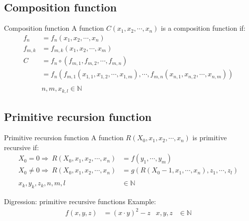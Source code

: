 \documentclass[]{beamer}
\begin{document}
\subsection{Composition function}

\begin{frame}{Composition function}
A function $C(x_1,x_2,\cdots,x_n)$ is a composition function if: \\
\begin{align*}
f_n &= f_n(x_1,x_2,\cdots,x_n) \\
f_{m,k} &= f_{m,k}(x_1,x_2,\cdots,x_m) \\
C &= f_n \circ (f_{m,1},f_{m,2},\cdots,f_{m,n})\\
&= f_n(f_{m,1}(x_{1,1},x_{1,2},\cdots,x_{1,m}),\cdots,f_{m,n}(x_{n,1},x_{n,2},\cdots,x_{n,m}))\\
\\
&n,m,x_{k,l } \in \mathbb{N}
\end{align*}
\end{frame}

\subsection{Primitive recursion function}

\begin{frame}{Primitive recursion function}
A function $R(X_0,x_1,x_2,\cdots,x_n)$ is primitive recursive if: \\
\begin{align*}
X_0=0 \Longrightarrow ~ R(X_0,x_1,x_2,\cdots,x_n) &= f(y_1,\cdots,y_m)\\
X_0\neq0 \Longrightarrow ~ R(X_0,x_1,x_2,\cdots,x_n) &= g(R(X_0-1,x_1,\cdots,x_n),z_1,\cdots,z_l)\\
\\
x_k,y_k,z_k,n,m,l &\in \mathbb{N}
\end{align*}
\end{frame}

\begin{frame}{Digression: primitive recursive functions}
Example:
\begin{align*}
f(x,y,z) &= (x\cdot y)^2-z & x,y,z &\in \mathbb{N}\\
\end{align*}
\end{frame}
\end{document}
